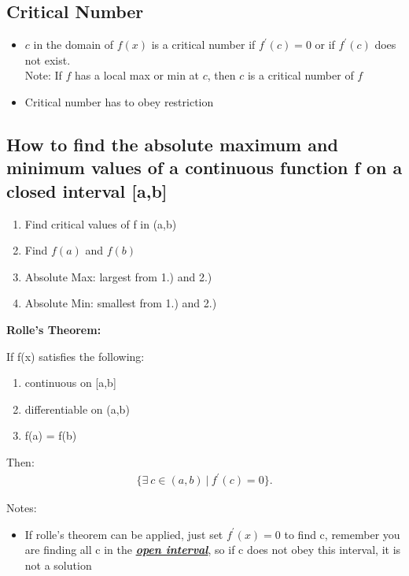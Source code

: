 \documentclass{report}
\begin{document}
    \bigbreak \noindent \bigbreak \noindent 
    \subsection{Critical Number}
    \begin{itemize}
      \item $c$ in the domain of $f(x)$ is a critical number if $f^{\prime}(c)=0$ or if $f^{\prime}(c)$ does not exist. \\
      Note: If $f$ has a local max or min at $c$, then $c$ is a critical number of $f$ 
      \item Critical number has to obey restriction
    \end{itemize}

    \bigbreak \noindent \bigbreak \noindent 
    \subsection{How to find the absolute maximum and minimum values of a continuous function f on a closed interval [a,b]}
      \begin{enumerate}
      \item Find critical values of f in (a,b)
      \item Find $f(a)$ and $f(b)$
      \item Absolute Max: largest from 1.) and 2.) 
      \item Absolute Min: smallest from 1.) and 2.)
    \end{enumerate}

    \bigbreak \noindent \bigbreak \noindent 
      \begin{large}
        \noindent \textbf{Rolle's Theorem:}
      \end{large}
     \bigbreak \noindent 
     If f(x) satisfies the following:
     \begin{enumerate}
       \item continuous on [a,b]
        \item differentiable on (a,b)
        \item f(a) = f(b)
     \end{enumerate}
     \smallbreak \noindent
     Then:
     \begin{align*}
       \{\exists\ c \in (a,b)\ |\ f^{\prime}(c) = 0\}
     .\end{align*}

     \bigbreak \noindent 
     Notes:
     \begin{itemize}
       \item If rolle's theorem can be applied, just set $f^{\prime}(x) = 0$ to find c, remember you are finding all c in the \textbf{\textit{\underline{open interval}}}, so if c does not obey this interval, it is not a solution
     \end{itemize}
\end{document}
